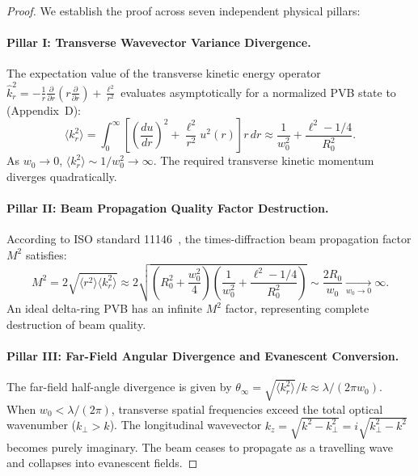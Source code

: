 \documentclass{optica-article}
\begin{document}
\begin{proof}
We establish the proof across seven independent physical pillars:

\paragraph{Pillar I: Transverse Wavevector Variance Divergence.}
The expectation value of the transverse kinetic energy operator $\hat{k}_r^2 = -\frac{1}{r}\frac{\partial}{\partial r}\left(r \frac{\partial}{\partial r}\right) + \frac{\ell^2}{r^2}$ evaluates asymptotically for a normalized PVB state to (Appendix~D):
\begin{equation}
\langle k_r^2 \rangle = \int_0^\infty \left[ \left(\frac{du}{dr}\right)^2 + \frac{\ell^2}{r^2} u^2(r) \right] r \, dr \approx \frac{1}{w_0^2} + \frac{\ell^2 - 1/4}{R_0^2}.
\end{equation}
As $w_0 \to 0$, $\langle k_r^2 \rangle \sim 1/w_0^2 \to \infty$. The required transverse kinetic momentum diverges quadratically.

\paragraph{Pillar II: Beam Propagation Quality Factor Destruction.}
According to ISO standard 11146~\cite{ISO11146}, the times-diffraction beam propagation factor $M^2$ satisfies:
\begin{equation}
M^2 = 2 \sqrt{\langle r^2 \rangle \langle k_r^2 \rangle} \approx 2 \sqrt{\left(R_0^2 + \frac{w_0^2}{4}\right)\left(\frac{1}{w_0^2} + \frac{\ell^2 - 1/4}{R_0^2}\right)} \sim \frac{2 R_0}{w_0} \xrightarrow[w_0 \to 0]{} \infty.
\end{equation}
An ideal delta-ring PVB has an infinite $M^2$ factor, representing complete destruction of beam quality.

\paragraph{Pillar III: Far-Field Angular Divergence and Evanescent Conversion.}
The far-field half-angle divergence is given by $\theta_\infty = \sqrt{\langle k_r^2 \rangle} / k \approx \lambda / (2\pi w_0)$. When $w_0 < \lambda / (2\pi)$, transverse spatial frequencies exceed the total optical wavenumber ($k_\perp > k$). The longitudinal wavevector $k_z = \sqrt{k^2 - k_\perp^2} = i \sqrt{k_\perp^2 - k^2}$ becomes purely imaginary. The beam ceases to propagate as a travelling wave and collapses into evanescent fields.


\end{proof}
\end{document}
